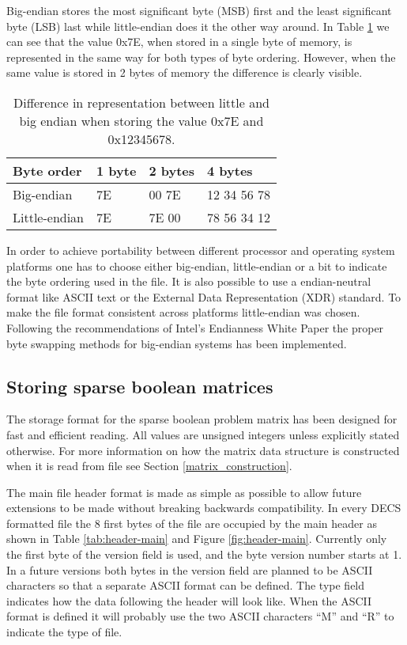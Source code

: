 Big-endian stores the most significant byte (MSB) first and the least significant byte (LSB) last while little-endian does it the other way around.
In Table \ref{tab:endian} we can see that the value 0x7E, when stored in a single byte of memory, is represented in the same way for both types of byte ordering.
However, when the same value is stored in 2 bytes of memory the difference is clearly visible.

\begin{table}[htbp]
	\centering
	\begin{tabular}{|l||l|l||l|}
		\hline
		\bf Byte order & \bf 1 byte & \bf 2 bytes & \bf 4 bytes \\ \hline
		Big-endian    & 7E & 00 7E & 12 34 56 78 \\ \hline
		Little-endian & 7E & 7E 00 & 78 56 34 12 \\ \hline
	\end{tabular}
	\caption{Difference in representation between little and big endian when storing the value 0x7E and 0x12345678.}
	\label{tab:endian}
\end{table}

In order to achieve portability between different processor and operating system platforms one has to choose either big-endian, little-endian or a bit to indicate the byte ordering used in the file.
It is also possible to use a endian-neutral format like ASCII text or the External Data Representation (XDR) \cite{RFC4506} standard.
To make the file format consistent across platforms little-endian was chosen.
Following the recommendations of Intel's Endianness White Paper \cite{intel-endian} the proper byte swapping methods for big-endian systems has been implemented.


\subsection{Storing sparse boolean matrices}

The storage format for the sparse boolean problem matrix has been designed for fast and efficient reading.
All values are unsigned integers unless explicitly stated otherwise.
For more information on how the matrix data structure is constructed when it is read from file see Section \ref{matrix_construction}.

The main file header format is made as simple as possible to allow future extensions to be made without breaking backwards compatibility.
In every DECS formatted file the 8 first bytes of the file are occupied by the main header as shown in Table \ref{tab:header-main} and Figure \ref{fig:header-main}.
Currently only the first byte of the version field is used, and the byte version number starts at 1.
In a future versions both bytes in the version field are planned to be ASCII characters so that a separate ASCII format can be defined.
The type field indicates how the data following the header will look like.
When the ASCII format is defined it will probably use the two ASCII characters ``M'' and ``R'' to indicate the type of file.

